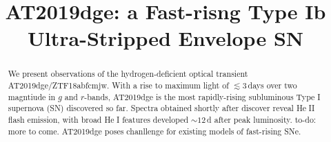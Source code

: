 \documentclass[twocolumn]{aastex63}
\def\ion#1#2{#1$\;${\footnotesize\rm{#2}}\relax}
\newcommand{\todo}[1]{{\color{magenta} to-do: {#1}}}
\begin{document}
\begin{CJK*}{UTF8}{gbsn}

\title{AT2019dge: a Fast-risng Type Ib Ultra-Stripped Envelope SN}








\begin{abstract}

We present observations of the hydrogen-deficient optical transient AT2019dge/ZTF18abfcmjw. With 
a rise to maximum light of $\lesssim 3$\,days over two magntiude in $g$ and $r$-bands, AT2019dge is 
the most rapidly-rising subluminous Type I supernova (SN) discovered so far. Spectra obtained shortly 
after discover reveal \ion{He}{II} flash emission, with broad \ion{He}{I} features developed $\sim12$\,d 
after peak luminosity. \todo{more to come.} AT2019dge poses chanllenge for existing models of 
fast-rising SNe.

\end{abstract}




\end{CJK*}
\end{document}
